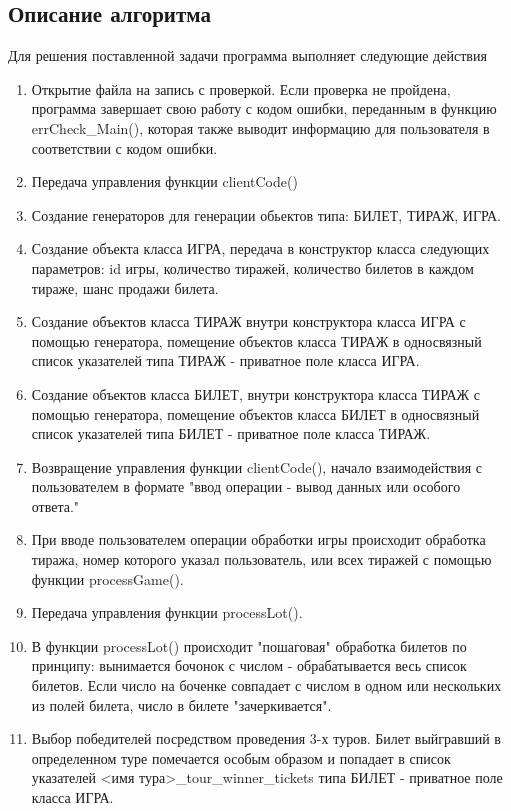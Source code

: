 \documentclass[a4paper,14pt]{article}
\begin{document}
\subsection{Описание алгоритма}
Для решения поставленной задачи программа выполняет следующие действия\newline
\begin{enumerate} 
  \item Открытие файла на запись с проверкой. Если проверка не пройдена, программа завершает свою работу с кодом ошибки, переданным в функцию errCheck\_Main(), которая также выводит информацию для пользователя в соответствии с кодом ошибки.
  \item Передача управления функции clientCode()
  \item Создание генераторов для генерации обьектов типа: БИЛЕТ, ТИРАЖ, ИГРА.
  \item Создание объекта класса ИГРА, передача в конструктор класса следующих параметров: id игры, количество тиражей, количество билетов в каждом тираже, шанс продажи билета.
  \item Создание объектов класса ТИРАЖ внутри конструктора класса ИГРА с помощью генератора, помещение объектов класса ТИРАЖ в односвязный список указателей типа ТИРАЖ - приватное поле класса ИГРА. 
  \item Создание объектов класса БИЛЕТ, внутри конструктора класса ТИРАЖ с помощью генератора, помещение объектов класса БИЛЕТ в односвязный список указателей типа БИЛЕТ - приватное поле класса ТИРАЖ. 
  \item Возвращение управления функции clientCode(), начало взаимодействия с пользователем в формате "ввод операции - вывод данных или особого ответа."
  \item При вводе пользователем операции обработки игры происходит обработка тиража, номер которого указал пользователь, или всех тиражей с помощью функции processGame().
  \item Передача управления функции processLot().
  \item В функции processLot() происходит "пошаговая" обработка билетов по принципу: вынимается бочонок с числом - обрабатывается весь список билетов. Если число на боченке совпадает с числом в одном или нескольких из полей билета, число в билете "зачеркивается".
  \item Выбор победителей посредством проведения 3-х туров. Билет выйгравший в определенном туре помечается особым образом и попадает в список указателей <имя тура>\_tour\_winner\_tickets типа БИЛЕТ - приватное поле класса ИГРА.

\end{enumerate}
\end{document}
